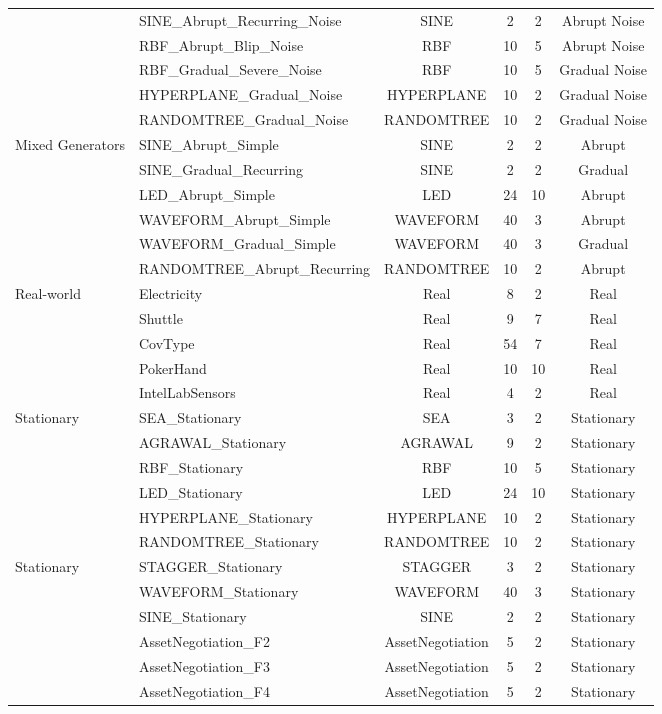 \begin{table}[htbp]
\begin{tabular}{llcccc}
 & SINE_Abrupt_Recurring_Noise & SINE & 2 & 2 & Abrupt Noise \\
 & RBF_Abrupt_Blip_Noise & RBF & 10 & 5 & Abrupt Noise \\
 & RBF_Gradual_Severe_Noise & RBF & 10 & 5 & Gradual Noise \\
 & HYPERPLANE_Gradual_Noise & HYPERPLANE & 10 & 2 & Gradual Noise \\
 & RANDOMTREE_Gradual_Noise & RANDOMTREE & 10 & 2 & Gradual Noise \\
\midrule
Mixed Generators & SINE_Abrupt_Simple & SINE & 2 & 2 & Abrupt \\
 & SINE_Gradual_Recurring & SINE & 2 & 2 & Gradual \\
 & LED_Abrupt_Simple & LED & 24 & 10 & Abrupt \\
 & WAVEFORM_Abrupt_Simple & WAVEFORM & 40 & 3 & Abrupt \\
 & WAVEFORM_Gradual_Simple & WAVEFORM & 40 & 3 & Gradual \\
 & RANDOMTREE_Abrupt_Recurring & RANDOMTREE & 10 & 2 & Abrupt \\
\midrule
Real-world & Electricity & Real & 8 & 2 & Real \\
 & Shuttle & Real & 9 & 7 & Real \\
 & CovType & Real & 54 & 7 & Real \\
 & PokerHand & Real & 10 & 10 & Real \\
 & IntelLabSensors & Real & 4 & 2 & Real \\
\midrule
Stationary & SEA_Stationary & SEA & 3 & 2 & Stationary \\
 & AGRAWAL_Stationary & AGRAWAL & 9 & 2 & Stationary \\
 & RBF_Stationary & RBF & 10 & 5 & Stationary \\
 & LED_Stationary & LED & 24 & 10 & Stationary \\
 & HYPERPLANE_Stationary & HYPERPLANE & 10 & 2 & Stationary \\
 & RANDOMTREE_Stationary & RANDOMTREE & 10 & 2 & Stationary \\
\midrule
Stationary & STAGGER_Stationary & STAGGER & 3 & 2 & Stationary \\
 & WAVEFORM_Stationary & WAVEFORM & 40 & 3 & Stationary \\
 & SINE_Stationary & SINE & 2 & 2 & Stationary \\
 & AssetNegotiation_F2 & AssetNegotiation & 5 & 2 & Stationary \\
 & AssetNegotiation_F3 & AssetNegotiation & 5 & 2 & Stationary \\
 & AssetNegotiation_F4 & AssetNegotiation & 5 & 2 & Stationary \\
\bottomrule
\end{tabular}
\end{table}
